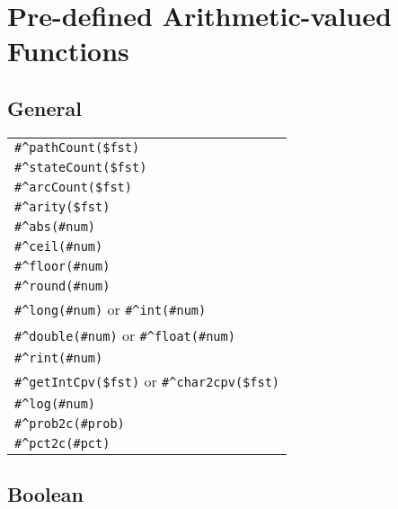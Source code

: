 \chapter{Pre-defined Arithmetic-valued Functions}

\section{General}

\begin{tabular}{|l|}
\hline
\verb!#^pathCount($fst)! \\
\verb!#^stateCount($fst)! \\
\verb!#^arcCount($fst)! \\
\verb!#^arity($fst)! \\
\hline
\verb!#^abs(#num)! \\
\verb!#^ceil(#num)! \\
\verb!#^floor(#num)! \\
\verb!#^round(#num)! \\
\hline
\verb!#^long(#num)! or \verb!#^int(#num)! \\
\verb!#^double(#num)! or \verb!#^float(#num)! \\
\verb!#^rint(#num)! \\
\hline 
\verb!#^getIntCpv($fst)! or \verb!#^char2cpv($fst)!\\
\hline
\verb!#^log(#num)!\\
\verb!#^prob2c(#prob)!\\
\verb!#^pct2c(#pct)!\\
\hline
\end{tabular}

\section{Boolean}

